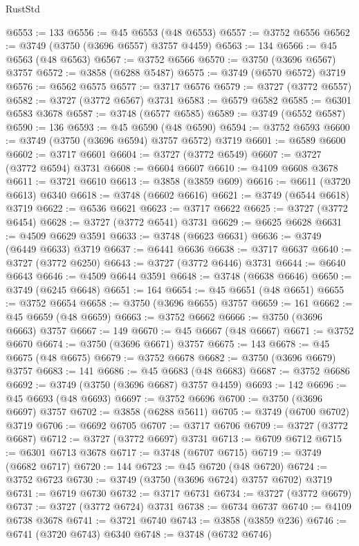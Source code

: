 \begin{lexlean}{RustStd}
\begin{coremodule}
@6553 := 133
@6556 := @45 @6553 (@48 @6553)
@6557 := @3752 @6556
@6562 := @3749 (@3750 (@3696 @6557) @3757 @4459)
@6563 := 134
@6566 := @45 @6563 (@48 @6563)
@6567 := @3752 @6566
@6570 := @3750 (@3696 @6567) @3757
@6572 := @3858 (@6288 @5487)
@6575 := @3749 (@6570 @6572) @3719
@6576 := @6562 @6575
@6577 := @3717 @6576
@6579 := @3727 (@3772 @6557)
@6582 := @3727 (@3772 @6567) @3731
@6583 := @6579 @6582
@6585 := @6301 @6583 @3678
@6587 := @3748 (@6577 @6585)
@6589 := @3749 (@6552 @6587)
@6590 := 136
@6593 := @45 @6590 (@48 @6590)
@6594 := @3752 @6593
@6600 := @3749 (@3750 (@3696 @6594) @3757 @6572) @3719
@6601 := @6589 @6600
@6602 := @3717 @6601
@6604 := @3727 (@3772 @6549)
@6607 := @3727 (@3772 @6594) @3731
@6608 := @6604 @6607
@6610 := @4109 @6608 @3678
@6611 := @3721 @6610
@6613 := @3858 (@3859 @609)
@6616 := @6611 (@3720 @6613) @6340
@6618 := @3748 (@6602 @6616)
@6621 := @3749 (@6544 @6618) @3719
@6622 := @6536 @6621
@6623 := @3717 @6622
@6625 := @3727 (@3772 @6454)
@6628 := @3727 (@3772 @6541) @3731
@6629 := @6625 @6628
@6631 := @4509 @6629 @3591
@6633 := @3748 (@6623 @6631)
@6636 := @3749 (@6449 @6633) @3719
@6637 := @6441 @6636
@6638 := @3717 @6637
@6640 := @3727 (@3772 @6250)
@6643 := @3727 (@3772 @6446) @3731
@6644 := @6640 @6643
@6646 := @4509 @6644 @3591
@6648 := @3748 (@6638 @6646)
@6650 := @3749 (@6245 @6648)
@6651 := 164
@6654 := @45 @6651 (@48 @6651)
@6655 := @3752 @6654
@6658 := @3750 (@3696 @6655) @3757
@6659 := 161
@6662 := @45 @6659 (@48 @6659)
@6663 := @3752 @6662
@6666 := @3750 (@3696 @6663) @3757
@6667 := 149
@6670 := @45 @6667 (@48 @6667)
@6671 := @3752 @6670
@6674 := @3750 (@3696 @6671) @3757
@6675 := 143
@6678 := @45 @6675 (@48 @6675)
@6679 := @3752 @6678
@6682 := @3750 (@3696 @6679) @3757
@6683 := 141
@6686 := @45 @6683 (@48 @6683)
@6687 := @3752 @6686
@6692 := @3749 (@3750 (@3696 @6687) @3757 @4459)
@6693 := 142
@6696 := @45 @6693 (@48 @6693)
@6697 := @3752 @6696
@6700 := @3750 (@3696 @6697) @3757
@6702 := @3858 (@6288 @5611)
@6705 := @3749 (@6700 @6702) @3719
@6706 := @6692 @6705
@6707 := @3717 @6706
@6709 := @3727 (@3772 @6687)
@6712 := @3727 (@3772 @6697) @3731
@6713 := @6709 @6712
@6715 := @6301 @6713 @3678
@6717 := @3748 (@6707 @6715)
@6719 := @3749 (@6682 @6717)
@6720 := 144
@6723 := @45 @6720 (@48 @6720)
@6724 := @3752 @6723
@6730 := @3749 (@3750 (@3696 @6724) @3757 @6702) @3719
@6731 := @6719 @6730
@6732 := @3717 @6731
@6734 := @3727 (@3772 @6679)
@6737 := @3727 (@3772 @6724) @3731
@6738 := @6734 @6737
@6740 := @4109 @6738 @3678
@6741 := @3721 @6740
@6743 := @3858 (@3859 @236)
@6746 := @6741 (@3720 @6743) @6340
@6748 := @3748 (@6732 @6746)

\end{coremodule}
\end{lexlean}

